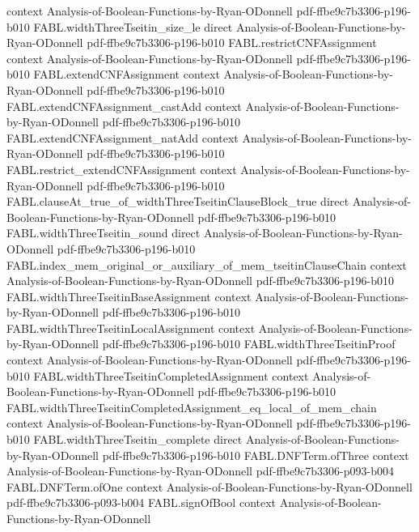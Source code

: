 \begin{theorem}
  {context}
  {Analysis-of-Boolean-Functions-by-Ryan-ODonnell}
  {pdf-ffbe9c7b3306-p196-b010}
\proofstep
  {FABL.widthThreeTseitin_size_le}
  {direct}
  {Analysis-of-Boolean-Functions-by-Ryan-ODonnell}
  {pdf-ffbe9c7b3306-p196-b010}
\proofstep
  {FABL.restrictCNFAssignment}
  {context}
  {Analysis-of-Boolean-Functions-by-Ryan-ODonnell}
  {pdf-ffbe9c7b3306-p196-b010}
\proofstep
  {FABL.extendCNFAssignment}
  {context}
  {Analysis-of-Boolean-Functions-by-Ryan-ODonnell}
  {pdf-ffbe9c7b3306-p196-b010}
\proofstep
  {FABL.extendCNFAssignment_castAdd}
  {context}
  {Analysis-of-Boolean-Functions-by-Ryan-ODonnell}
  {pdf-ffbe9c7b3306-p196-b010}
\proofstep
  {FABL.extendCNFAssignment_natAdd}
  {context}
  {Analysis-of-Boolean-Functions-by-Ryan-ODonnell}
  {pdf-ffbe9c7b3306-p196-b010}
\proofstep
  {FABL.restrict_extendCNFAssignment}
  {context}
  {Analysis-of-Boolean-Functions-by-Ryan-ODonnell}
  {pdf-ffbe9c7b3306-p196-b010}
\proofstep
  {FABL.clauseAt_true_of_widthThreeTseitinClauseBlock_true}
  {direct}
  {Analysis-of-Boolean-Functions-by-Ryan-ODonnell}
  {pdf-ffbe9c7b3306-p196-b010}
\proofstep
  {FABL.widthThreeTseitin_sound}
  {direct}
  {Analysis-of-Boolean-Functions-by-Ryan-ODonnell}
  {pdf-ffbe9c7b3306-p196-b010}
\proofstep
  {FABL.index_mem_original_or_auxiliary_of_mem_tseitinClauseChain}
  {context}
  {Analysis-of-Boolean-Functions-by-Ryan-ODonnell}
  {pdf-ffbe9c7b3306-p196-b010}
\proofstep
  {FABL.widthThreeTseitinBaseAssignment}
  {context}
  {Analysis-of-Boolean-Functions-by-Ryan-ODonnell}
  {pdf-ffbe9c7b3306-p196-b010}
\proofstep
  {FABL.widthThreeTseitinLocalAssignment}
  {context}
  {Analysis-of-Boolean-Functions-by-Ryan-ODonnell}
  {pdf-ffbe9c7b3306-p196-b010}
\proofstep
  {FABL.widthThreeTseitinProof}
  {context}
  {Analysis-of-Boolean-Functions-by-Ryan-ODonnell}
  {pdf-ffbe9c7b3306-p196-b010}
\proofstep
  {FABL.widthThreeTseitinCompletedAssignment}
  {context}
  {Analysis-of-Boolean-Functions-by-Ryan-ODonnell}
  {pdf-ffbe9c7b3306-p196-b010}
\proofstep
  {FABL.widthThreeTseitinCompletedAssignment_eq_local_of_mem_chain}
  {context}
  {Analysis-of-Boolean-Functions-by-Ryan-ODonnell}
  {pdf-ffbe9c7b3306-p196-b010}
\proofstep
  {FABL.widthThreeTseitin_complete}
  {direct}
  {Analysis-of-Boolean-Functions-by-Ryan-ODonnell}
  {pdf-ffbe9c7b3306-p196-b010}
\proofstep
  {FABL.DNFTerm.ofThree}
  {context}
  {Analysis-of-Boolean-Functions-by-Ryan-ODonnell}
  {pdf-ffbe9c7b3306-p093-b004}
\proofstep
  {FABL.DNFTerm.ofOne}
  {context}
  {Analysis-of-Boolean-Functions-by-Ryan-ODonnell}
  {pdf-ffbe9c7b3306-p093-b004}
\proofstep
  {FABL.signOfBool}
  {context}
  {Analysis-of-Boolean-Functions-by-Ryan-ODonnell}

\end{theorem}
